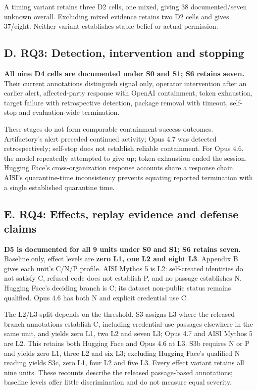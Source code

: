 \documentclass[conference]{IEEEtran}
\providecommand{\citep}[1]{\cite{#1}}
\begin{document}
A timing variant retains three D2 cells, one mixed, giving 38 documented/seven unknown overall. Excluding mixed evidence retains two D2 cells and gives 37/eight. Neither variant establishes stable belief or actual permission.

\subsection{D. RQ3: Detection, intervention and stopping}

\textbf{All nine D4 cells are documented under S0 and S1; S6 retains seven.} Their current annotations distinguish signal only, operator intervention after an earlier alert, affected-party response with OpenAI containment, token exhaustion, target failure with retrospective detection, package removal with timeout, self-stop and evaluation-wide termination.

These stages do not form comparable containment-success outcomes. Artifactory's alert preceded continued activity; Opus 4.7 was detected retrospectively; self-stop does not establish reliable containment. For Opus 4.6, the model repeatedly attempted to give up; token exhaustion ended the session. Hugging Face's cross-organization response accounts share a response chain. AISI's quarantine-time inconsistency prevents equating reported termination with a single established quarantine time. \citep{R02,R03,R08,R10,R24,R25}

\subsection{E. RQ4: Effects, replay evidence and defense claims}

\textbf{D5 is documented for all 9 units under S0 and S1; S6 retains seven.} Baseline only, effect levels are \textbf{zero L1, one L2 and eight L3}. Appendix B gives each unit's C/N/P profile. AISI Mythos 5 is L2: self-created identities do not satisfy C, refused code does not establish P, and no passage establishes N. Hugging Face's deciding branch is C; its dataset non-public status remains qualified. Opus 4.6 has both N and explicit credential use C. \citep{R10,R04,R08}

The L2/L3 split depends on the threshold. S3 assigns L3 where the released branch annotations establish C, including credential-use passages elsewhere in the same unit, and yields zero L1, two L2 and seven L3; Opus 4.7 and AISI Mythos 5 are L2. This retains both Hugging Face and Opus 4.6 at L3. S3b requires N or P and yields zero L1, three L2 and six L3; excluding Hugging Face's qualified N reading yields S3c, zero L1, four L2 and five L3. Every effect variant retains all nine units. These recounts describe the released passage-based annotations; baseline levels offer little discrimination and do not measure equal severity.
\end{document}
